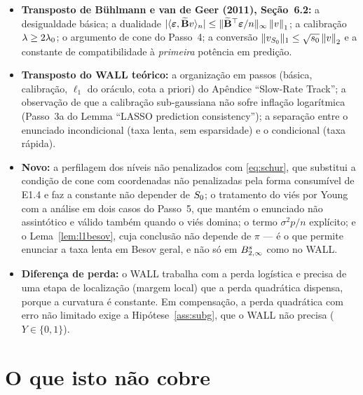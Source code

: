 \documentclass[11pt,a4paper]{article}
\newcommand{\Bmat}{\mathbf{B}}
\newcommand{\Btil}{\widetilde{\Bmat}}
\newcommand{\bveps}{\boldsymbol{\varepsilon}}
\begin{document}
\begin{itemize}[nosep, leftmargin=*]
  \item \textbf{Transposto de Bühlmann e van de Geer (2011), Seção~6.2:} a
    desigualdade básica; a dualidade $|\inner{\bveps}{\Btil v}_{n}| \le
    \lVert\Btil\T\bveps/n\rVert_{\infty}\norm{v}_{1}$; a calibração
    $\lambda \ge 2\lambda_{0}$; o argumento de cone do Passo~4; a conversão
    $\lVert v_{S_{0}}\rVert_{1} \le \sqrt{s_{0}}\left\lVert v \right\rVert_{2}$ e a constante de
    compatibilidade à \emph{primeira} potência em predição.
  \item \textbf{Transposto do WALL teórico:} a organização em passos
    (básica, calibração, $\ell_{1}$ do oráculo, cota a priori) do Apêndice
    ``Slow-Rate Track''; a observação de que a calibração sub-gaussiana não
    sofre inflação logarítmica (Passo~3a do Lemma ``LASSO prediction
    consistency''); a separação entre o enunciado incondicional (taxa lenta,
    sem esparsidade) e o condicional (taxa rápida).
  \item \textbf{Novo:} a perfilagem dos níveis não penalizados com
    \eqref{eq:schur}, que substitui a condição de cone com coordenadas não
    penalizadas pela forma consumível de E1.4 e faz a constante não depender
    de $S_{0}$; o tratamento do viés por Young com a análise em dois casos do
    Passo~5, que mantém o enunciado não assintótico e válido também quando o
    viés domina; o termo $\sigma^{2}p/n$ explícito; e o
    Lema~\ref{lem:l1besov}, cuja conclusão não depende de $\pi$ --- é o que
    permite enunciar a taxa lenta em Besov geral, e não só em
    $B^{s}_{2,\infty}$ como no WALL.
  \item \textbf{Diferença de perda:} o WALL trabalha com a perda logística e
    precisa de uma etapa de localização (margem local) que a perda quadrática
    dispensa, porque a curvatura é constante. Em compensação, a perda
    quadrática com erro não limitado exige a Hipótese~\ref{ass:subg}, que o
    WALL não precisa ($Y \in \{0,1\}$).
\end{itemize}

\section{O que isto não cobre}
\end{document}
